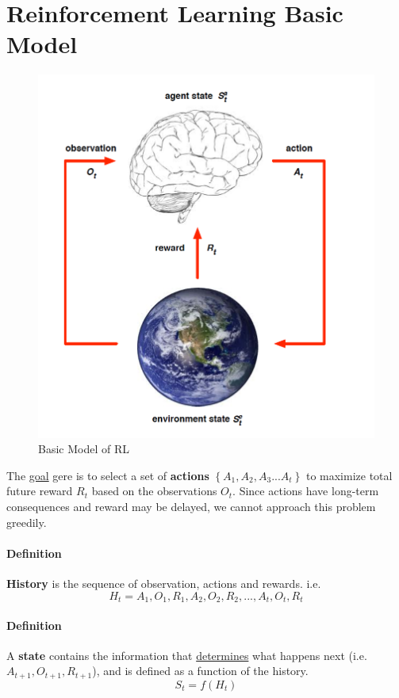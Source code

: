 \documentclass{article}
\begin{document}
	\section{Reinforcement Learning Basic Model}
	\begin{figure}[h]
		\includegraphics[scale=0.5]{model.png}
		\centering
		\caption{Basic Model of RL}
	\end{figure}
	The \underline{goal} gere is to select a set of \textbf{actions} $ \left\{ A_1, A_2, A_3 ... A_t \right\} $ to maximize total future reward $R_t$ based on the observations $O_t$. Since actions have long-term consequences and reward may be delayed, we cannot approach this problem greedily.
	
	\paragraph{Definition} \textbf{History} is the sequence of observation, actions and rewards. i.e. 
	\begin{equation*} %
	H_t = A_1, O_1, R_1, A_2, O_2, R_2, ... , A_t, O_t, R_t
	\end{equation*}
	
	\paragraph{Definition} A \textbf{state} contains the information that \underline{determines} what happens next (i.e. $A_{t+1}, O_{t+1}, R_{t+1}$), and is defined as a function of the history.
	\begin{equation*}
	S_t = f(H_t)
	\end{equation*}
	
\end{document}
